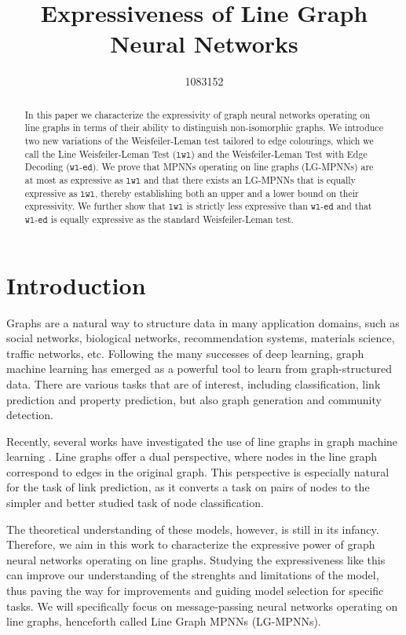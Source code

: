 \documentclass{article}
\title{Expressiveness of Line Graph Neural Networks}
\author{%
    1083152
}
\newcommand{\wledge}{\texttt{wl-ed}}
\newcommand{\lwl}{\texttt{lwl}}
\begin{document}
\maketitle


\begin{abstract}
    In this paper we characterize the expressivity of graph neural networks operating on line graphs in terms of their ability to distinguish non-isomorphic graphs. We introduce two new variations of the Weisfeiler-Leman test tailored to edge colourings, which we call the Line Weisfeiler-Leman Test ($\lwl$) and the Weisfeiler-Leman Test with Edge Decoding ($\wledge$). We prove that MPNNs operating on line graphs (LG-MPNNs) are at most as expressive as $\lwl$ and that there exists an LG-MPNNs that is equally expressive as $\lwl$, thereby establishing both an upper and a lower bound on their expressivity. We further show that $\lwl$ is strictly less expressive than $\wledge$ and that $\wledge$ is equally expressive as the standard Weisfeiler-Leman test.
\end{abstract}


\section{Introduction}
Graphs are a natural way to structure data in many application domains, such as social networks, biological networks, recommendation systems, materials science, traffic networks, etc.
Following the many successes of deep learning, graph machine learning has emerged as a powerful tool to learn from graph-structured data. There are various tasks that are of interest, including classification, link prediction and property prediction, but also graph generation and community detection.

Recently, several works have investigated the use of line graphs in graph machine learning \cite{cai2021line,choudhary2021atomistic}. Line graphs offer a dual perspective, where nodes in the line graph correspond to edges in the original graph. This perspective is especially natural for the task of link prediction, as it converts a task on pairs of nodes to the simpler and better studied task of node classification.

The theoretical understanding of these models, however, is still in its infancy.
Therefore, we aim in this work to characterize the expressive power of graph neural networks operating on line graphs. Studying the expressiveness like this can improve our understanding of the strenghts and limitations of the model, thus paving the way for improvements and guiding model selection for specific tasks. We will specifically focus on message-passing neural networks operating on line graphs, henceforth called Line Graph MPNNs (LG-MPNNs).
\end{document}

